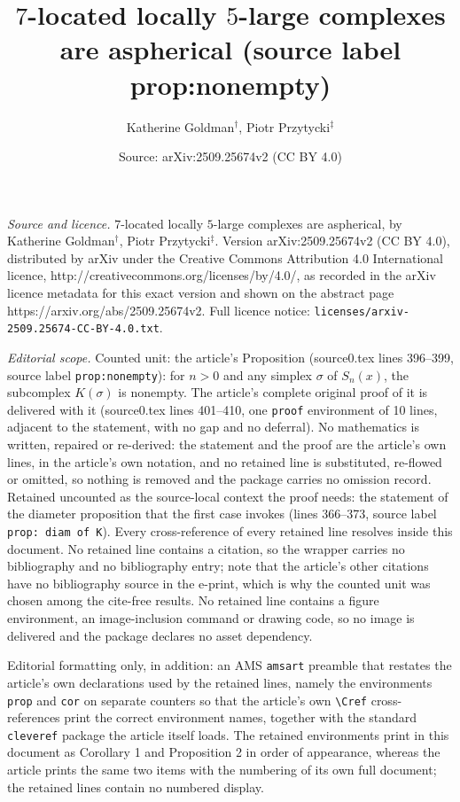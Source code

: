 \documentclass[10pt,a4paper]{amsart}
\title[prop:nonempty]{$7$-located locally $5$-large complexes are aspherical (source label prop:nonempty)}
\author{Katherine Goldman$^{\dag}$, Piotr Przytycki$^{\ddag}$}
\date{Source: arXiv:2509.25674v2 (CC BY 4.0)}
\begin{document}
\maketitle

\noindent\emph{Source and licence.} $7$-located locally $5$-large complexes are aspherical, by Katherine Goldman$^{\dag}$, Piotr Przytycki$^{\ddag}$. Version arXiv:2509.25674v2 (CC BY 4.0),
distributed by arXiv under the Creative Commons Attribution 4.0 International licence,
http://creativecommons.org/licenses/by/4.0/, as recorded in the arXiv licence metadata for this exact version
and shown on the abstract page https://arxiv.org/abs/2509.25674v2. Full licence notice:
\texttt{licenses/arxiv-2509.25674-CC-BY-4.0.txt}.\par\smallskip

\noindent\textit{Editorial scope.} Counted unit: the article's Proposition (source0.tex lines 396--399, source label \texttt{prop:nonempty}): for $n>0$ and any simplex $\sigma$ of $S_n(x)$, the subcomplex $K(\sigma)$ is nonempty. The article's complete original proof of it is delivered with it (source0.tex lines 401--410, one \texttt{proof} environment of 10 lines, adjacent to the statement, with no gap and no deferral). No mathematics is written, repaired or re-derived: the statement and the proof are the article's own lines, in the article's own notation, and no retained line is substituted, re-flowed or omitted, so nothing is removed and the package carries no omission record. Retained uncounted as the source-local context the proof needs: the statement of the diameter proposition that the first case invokes (lines 366--373, source label \texttt{prop: diam of K}). Every cross-reference of every retained line resolves inside this document. No retained line contains a citation, so the wrapper carries no bibliography and no bibliography entry; note that the article's other citations have no bibliography source in the e-print, which is why the counted unit was chosen among the cite-free results. No retained line contains a figure environment, an image-inclusion command or drawing code, so no image is delivered and the package declares no asset dependency.

Editorial formatting only, in addition: an AMS \texttt{amsart} preamble that restates the article's own declarations used by the retained lines, namely the environments \texttt{prop} and \texttt{cor} on separate counters so that the article's own \texttt{\textbackslash Cref} cross-references print the correct environment names, together with the standard \texttt{cleveref} package the article itself loads. The retained environments print in this document as Corollary 1 and Proposition 2 in order of appearance, whereas the article prints the same two items with the numbering of its own full document; the retained lines contain no numbered display.
\end{document}
